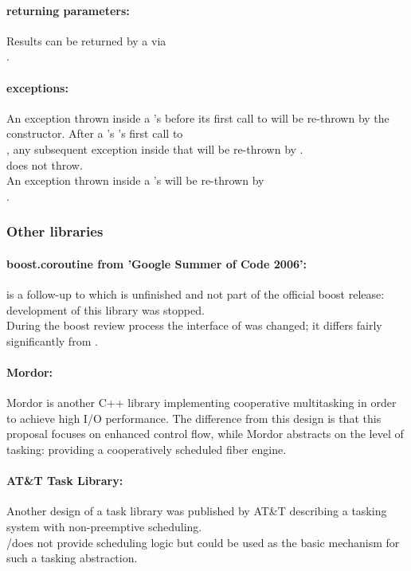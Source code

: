 \paragraph*{returning parameters:}
Results can be returned by a \corofunction via\\
\pushcoroop.\\

\paragraph*{exceptions:}
An exception thrown inside a \pullcoro's \corofunction before its first call to
\pushcoroop will be re-thrown by the \pullcoro constructor. After a \pullcoro's
\corofunction's first call to\\
\pushcoroop, any subsequent exception inside that
\corofunction will be re-thrown by \pullcoroop.\\
\pullcoroget does not throw.\\
\newline
An exception thrown inside a \pushcoro's \corofunction will be re-thrown by\\
\pushcoroop.


\subsubsection*{Other libraries}
\paragraph*{boost.coroutine from 'Google Summer of Code 2006':}
\boostcoroutine is a follow-up to \boostcorosum which is unfinished and
not part of the official boost release: development of this library was
stopped.\\
During the boost review process the interface of \boostcoroutine was changed; it
differs fairly significantly from \boostcorosum.

\paragraph*{Mordor:}
Mordor\cite{mordor} is another C++ library implementing cooperative multitasking
in order to achieve high I/O performance. The difference from this design is that
this proposal focuses on enhanced control flow, while Mordor\cite{mordor} abstracts
on the level of tasking: providing a cooperatively scheduled fiber engine.

\paragraph*{AT\&T Task Library:}
Another design of a task library was published by AT\&T\cite{atnt1989}
describing a tasking system with non-preemptive scheduling.\\
\pushcoro/\pullcoro does not provide scheduling logic but could be used as the
basic mechanism for such a tasking abstraction.

